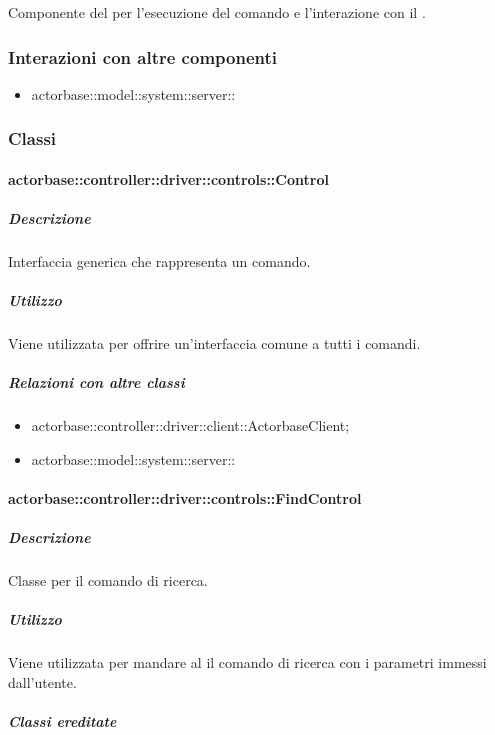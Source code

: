\documentclass{scalatekids-article}
\begin{document}
Componente del  per l'esecuzione del comando e l'interazione con il .

\subsubsection{Interazioni con altre componenti}

\begin{itemize}
\item actorbase::model::system::server:: %
\end{itemize}

\subsubsection{Classi}

\paragraph{actorbase::controller::driver::controls::Control}

\subparagraph{Descrizione}

Interfaccia generica che rappresenta un comando.

\subparagraph{Utilizzo}

Viene utilizzata per offrire un'interfaccia comune a tutti i comandi.

\subparagraph{Relazioni con altre classi}

\begin{itemize}
\item actorbase::controller::driver::client::ActorbaseClient;
\item actorbase::model::system::server:: %
\end{itemize}

\paragraph{actorbase::controller::driver::controls::FindControl}

\subparagraph{Descrizione}

Classe per il comando di ricerca.

\subparagraph{Utilizzo}

Viene utilizzata per mandare al  il comando di ricerca con i parametri immessi dall'utente.

\subparagraph{Classi ereditate}
\end{document}
